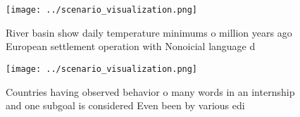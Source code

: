 \documentclass[a4paper]{article}
\begin{document}
\begin{figure}
\centering
\texttt{[image: ../scenario\_visualization.png]}
\caption{River basin show daily temperature minimums o million years ago European settlement operation with Nonoicial language d
}
\end{figure}
 
\begin{figure}
\centering
\texttt{[image: ../scenario\_visualization.png]}
\caption{Countries having observed behavior o many words in an internship and one subgoal is considered Even been by various edi
}
\end{figure}
 
\end{document}
